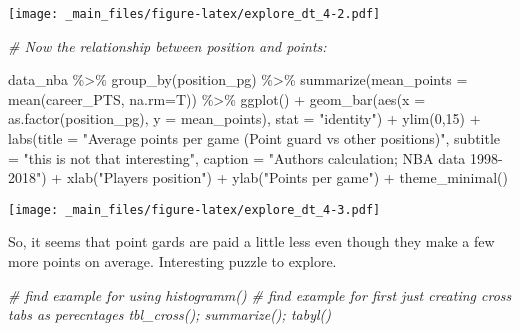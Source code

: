 \documentclass[
]{book}
\newenvironment{Shaded}{\begin{snugshade}}{\end{snugshade}}
\newcommand{\AttributeTok}[1]{\textcolor[rgb]{0.77,0.63,0.00}{#1}}
\newcommand{\AttributeTok}[1]{\textcolor[rgb]{0.13,0.29,0.53}{#1}}
\newcommand{\CommentTok}[1]{\textcolor[rgb]{0.56,0.35,0.01}{\textit{#1}}}
\newcommand{\DecValTok}[1]{\textcolor[rgb]{0.00,0.00,0.81}{#1}}
\newcommand{\FunctionTok}[1]{\textcolor[rgb]{0.00,0.00,0.00}{#1}}
\newcommand{\FunctionTok}[1]{\textcolor[rgb]{0.13,0.29,0.53}{\textbf{#1}}}
\newcommand{\NormalTok}[1]{#1}
\newcommand{\SpecialCharTok}[1]{\textcolor[rgb]{0.00,0.00,0.00}{#1}}
\newcommand{\SpecialCharTok}[1]{\textcolor[rgb]{0.81,0.36,0.00}{\textbf{#1}}}
\newcommand{\StringTok}[1]{\textcolor[rgb]{0.31,0.60,0.02}{#1}}
\begin{document}
\texttt{[image: \_main\_files/figure-latex/explore\_dt\_4-2.pdf]}

\begin{Shaded}
\begin{Highlighting}[]
\CommentTok{\# Now the relationship between position and points:}

\NormalTok{data\_nba }\SpecialCharTok{\%\textgreater{}\%} 
  \FunctionTok{group\_by}\NormalTok{(position\_pg) }\SpecialCharTok{\%\textgreater{}\%}
  \FunctionTok{summarize}\NormalTok{(}\AttributeTok{mean\_points =} \FunctionTok{mean}\NormalTok{(career\_PTS, }\AttributeTok{na.rm=}\NormalTok{T)) }\SpecialCharTok{\%\textgreater{}\%}
  \FunctionTok{ggplot}\NormalTok{() }\SpecialCharTok{+}
  \FunctionTok{geom\_bar}\NormalTok{(}\FunctionTok{aes}\NormalTok{(}\AttributeTok{x =} \FunctionTok{as.factor}\NormalTok{(position\_pg), }
               \AttributeTok{y =}\NormalTok{ mean\_points),}
           \AttributeTok{stat =} \StringTok{"identity"}\NormalTok{) }\SpecialCharTok{+} 
  \FunctionTok{ylim}\NormalTok{(}\DecValTok{0}\NormalTok{,}\DecValTok{15}\NormalTok{) }\SpecialCharTok{+}
  \FunctionTok{labs}\NormalTok{(}\AttributeTok{title =} \StringTok{"Average points per game (Point guard vs other positions)"}\NormalTok{,}
       \AttributeTok{subtitle =} \StringTok{"this is not that interesting"}\NormalTok{,}
       \AttributeTok{caption =} \StringTok{"Authors\textquotesingle{} calculation; NBA data 1998{-}2018"}\NormalTok{) }\SpecialCharTok{+}
  \FunctionTok{xlab}\NormalTok{(}\StringTok{"Player\textquotesingle{}s position"}\NormalTok{) }\SpecialCharTok{+}
  \FunctionTok{ylab}\NormalTok{(}\StringTok{"Points per game"}\NormalTok{) }\SpecialCharTok{+}
  \FunctionTok{theme\_minimal}\NormalTok{()}
\end{Highlighting}
\end{Shaded}

\texttt{[image: \_main\_files/figure-latex/explore\_dt\_4-3.pdf]}

So, it seems that point gards are paid a little less even though they make a few more points on average. Interesting puzzle to explore.

\begin{Shaded}
\begin{Highlighting}[]
\CommentTok{\# find example for using histogramm()}
\CommentTok{\# find example for first just creating cross tabs as perecntages tbl\_cross(); summarize(); tabyl()}
\end{Highlighting}
\end{Shaded}
\end{document}
